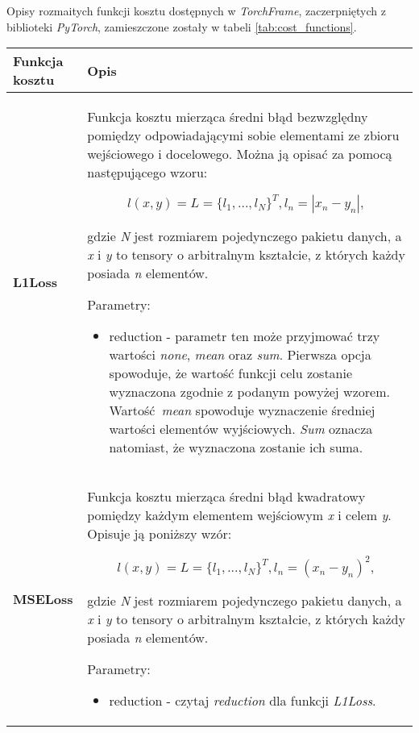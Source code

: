 \begin{enumerate}
    Opisy rozmaitych funkcji kosztu dostępnych w \textit{TorchFrame}, zaczerpniętych z biblioteki \textit{PyTorch},
    zamieszczone zostały w tabeli \ref{tab:cost_functions}.

    \begin{longtable}{ |m{2cm}|m{11cm}| }

     \hline
       \textbf{Funkcja kosztu} & \textbf{Opis} \\

     \hline
       \textbf{L1Loss} &

       Funkcja kosztu mierząca średni błąd bezwzględny pomiędzy
       odpowiadającymi sobie elementami ze zbioru wejściowego i docelowego.
       Można ją opisać za pomocą następującego wzoru:

       \[l(x,y) = L = \{l_1,...,l_N\}^T, l_n = |x_n - y_n|,\]

       gdzie \textit{N} jest rozmiarem pojedynczego pakietu danych, a \textit{x} i
       \textit{y} to tensory o arbitralnym kształcie, z których każdy posiada
       \textit{n} elementów.

       Parametry:
       \begin{itemize}
       \item reduction - parametr ten może przyjmować trzy wartości \textit{none},
       \textit{mean} oraz \textit{sum}. Pierwsza opcja spowoduje, że wartość funkcji
       celu zostanie wyznaczona zgodnie z podanym powyżej wzorem. Wartość \textit{mean}
       spowoduje wyznaczenie średniej wartości elementów wyjściowych. \textit{Sum}
       oznacza natomiast, że wyznaczona zostanie ich suma.
       \end{itemize} \\

     \hline
       \textbf{MSELoss} &

       Funkcja kosztu mierząca średni błąd kwadratowy pomiędzy każdym elementem
       wejściowym \textit{x} i celem \textit{y}. Opisuje ją poniższy wzór:

       \[l(x,y) = L = \{l_1,...,l_N\}^T, l_n = (x_n - y_n)^2,\]

       gdzie \textit{N} jest rozmiarem pojedynczego pakietu danych, a \textit{x} i
       \textit{y} to tensory o arbitralnym kształcie, z których każdy posiada
       \textit{n} elementów.

       Parametry:
       \begin{itemize}
       \item reduction - czytaj \textit{reduction} dla funkcji \textit{L1Loss}.
       \end{itemize} \\


\end{longtable}
\end{enumerate}
